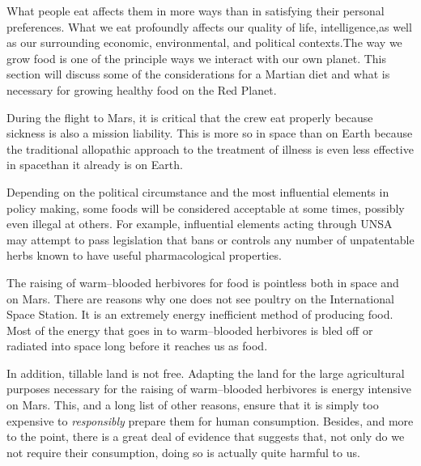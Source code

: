 

What people eat affects them in more ways than in satisfying their personal preferences. What we eat profoundly affects our quality of life, intelligence, as well as our surrounding economic, environmental, and political contexts. The way we grow food is one of the principle ways we interact with our own planet. This section will discuss some of the considerations for a Martian diet and what is necessary for growing healthy food on the Red Planet.

During the flight to Mars, it is critical that the crew eat properly because sickness is also a mission liability. This is more so in space than on Earth because the traditional allopathic approach to the treatment of illness is even less effective in space than it already is on Earth.

Depending on the political circumstance and the most influential elements in policy making, some foods will be considered acceptable at some times, possibly even illegal at others. For example, influential elements acting through UNSA may attempt to pass legislation that bans or controls any number of unpatentable herbs known to have useful pharmacological properties.

The raising of warm--blooded herbivores for food is pointless both in space and on Mars. There are reasons why one does not see poultry on the International Space Station. It is an extremely energy inefficient method of producing food. Most of the energy that goes in to warm--blooded herbivores is bled off or radiated into space long before it reaches us as food.

In addition, tillable land is not free. Adapting the land for the large agricultural purposes necessary for the raising of warm--blooded herbivores is energy intensive on Mars. This, and a long list of other reasons, ensure that it is simply too expensive to {\it responsibly} prepare them for human consumption. Besides, and more to the point, there is a great deal of evidence that suggests that, not only do we not require their consumption, doing so is actually quite harmful to us.

